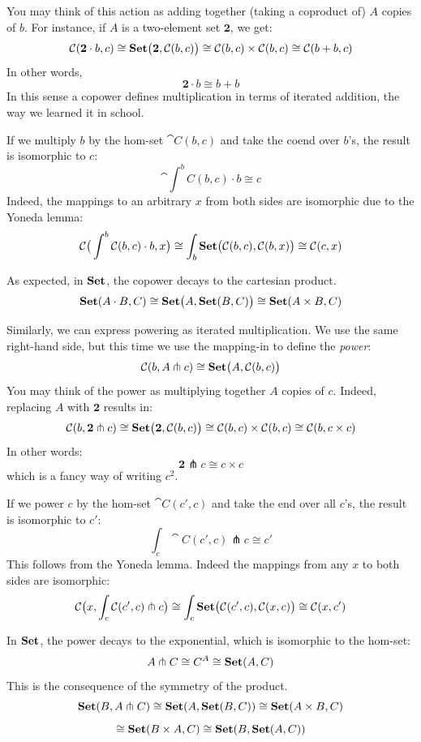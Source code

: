 \documentclass[DaoFP]{subfiles}
\begin{document}
You may think of this action as adding together (taking a coproduct of) $A$ copies of $b$. For instance, if $A$ is a two-element set $\mathbf 2$, we get:
\[ \mathcal{C} (\mathbf 2 \cdot b, c) \cong \mathbf{Set} \big( \mathbf 2, \mathcal{C} (b, c)\big) \cong \mathcal{C}(b, c) \times \mathcal{C}(b, c) \cong \mathcal{C}(b + b, c) \]
In other words, 
\[ \mathbf 2 \cdot b \cong b + b \]
In this sense a copower defines multiplication in terms of iterated addition, the way we learned it in school. 

If we multiply $b$ by the hom-set $\cat C (b, c)$ and take the coend over $b$'s, the result is isomorphic to $c$:
\[ \cat \int^b C(b, c) \cdot b \cong c \]
Indeed, the mappings to an arbitrary $x$ from both sides are isomorphic due to the Yoneda lemma:
\[ \mathcal{C} \big( \int^b \mathcal{C}(b, c) \cdot b, x\big) \cong \int_b \mathbf{Set} \big( \mathcal{C}(b, c), \mathcal{C} (b, x)\big) \cong \mathcal{C} (c, x)\]



As expected, in $\mathbf{Set}$, the copower decays to the cartesian product.
\[ \mathbf{Set} (A \cdot B, C) \cong \mathbf{Set} \big( A, \mathbf{Set}(B, C)\big) \cong \mathbf{Set} (A \times B, C) \]

Similarly, we can express powering as iterated multiplication. We use the same right-hand side, but this time we use the mapping-in to define the \emph{power}:
\[ \mathcal{C} (b, A \pitchfork c) \cong \mathbf{Set}  \big(A, \mathcal{C}(b, c)\big) \]
You may think of the power as multiplying together $A$ copies of $c$. Indeed, replacing $A$ with $\mathbf 2$ results in:
\[ \mathcal{C} (b, \mathbf 2 \pitchfork c) \cong \mathbf{Set}  \big(\mathbf 2, \mathcal{C}(b, c)\big) \cong \mathcal{C}(b, c) \times \mathcal{C}(b, c) \cong \mathcal{C} (b, c \times c)\]
In other words:
\[ \mathbf 2 \pitchfork c \cong c \times c \]
which is a fancy way of writing $c^2$.

If we power $c$ by the hom-set $\cat C(c', c)$ and take the end over all $c$'s, the result is isomorphic to $c'$:
\[ \int_c \cat C (c', c) \pitchfork c \cong c' \]
This follows from the Yoneda lemma. Indeed the mappings from any $x$ to both sides are isomorphic:
\[ \mathcal{C} \big(x, \int_c \mathcal{C} (c', c) \pitchfork c\big) \cong \int_c \mathbf{Set} \big( \mathcal{C}(c', c), \mathcal{C}(x, c)\big)  \cong \mathcal{C} (x, c') \]


In $\mathbf{Set}$, the power decays to the exponential, which is isomorphic to the hom-set:
\[ A \pitchfork C \cong C^A \cong \mathbf{Set} (A, C) \]
This is the consequence of the symmetry of the product.
\[ \mathbf{Set}(B, A \pitchfork C) \cong \mathbf{Set} (A, \mathbf{Set}(B, C)) \cong \mathbf{Set} (A \times B, C) \]
\[ \cong \mathbf{Set} (B \times A, C) \cong \mathbf{Set} (B, \mathbf{Set} (A, C))\]
\end{document}
